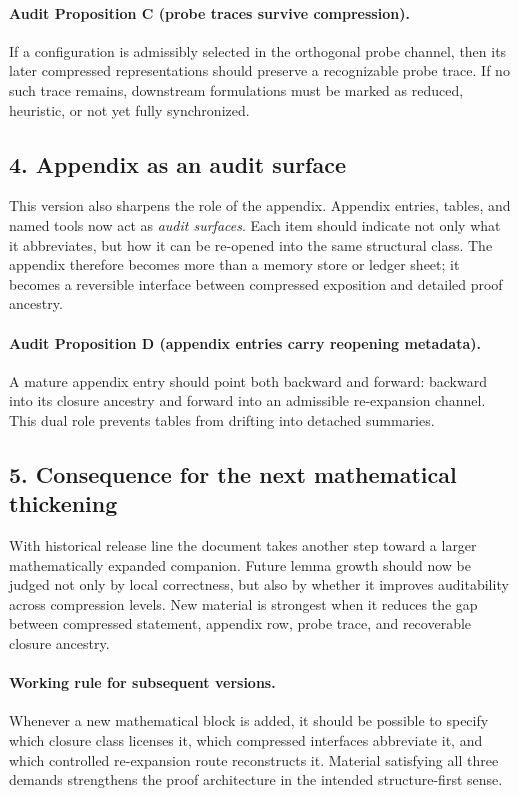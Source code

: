 \documentclass[12pt,a4paper]{article}
\DeclareRobustCommand{\QSCver}[1]{archival stage}
\renewcommand{\QSCver}[1]{historical release line}
\begin{document}
\paragraph{Audit Proposition C (probe traces survive compression).}
If a configuration is admissibly selected in the orthogonal probe channel, then
its later compressed representations should preserve a recognizable probe trace.
If no such trace remains, downstream formulations must be marked as reduced,
heuristic, or not yet fully synchronized.

\subsection*{4. Appendix as an audit surface}
This version also sharpens the role of the appendix. Appendix entries, tables,
and named tools now act as \emph{audit surfaces}. Each item should indicate not
only what it abbreviates, but how it can be re-opened into the same structural
class. The appendix therefore becomes more than a memory store or ledger sheet;
it becomes a reversible interface between compressed exposition and detailed
proof ancestry.

\paragraph{Audit Proposition D (appendix entries carry reopening metadata).}
A mature appendix entry should point both backward and forward: backward into
its closure ancestry and forward into an admissible re-expansion channel. This
dual role prevents tables from drifting into detached summaries.

\subsection*{5. Consequence for the next mathematical thickening}
With \QSCver{v2.1.0} the document takes another step toward a larger mathematically
expanded companion. Future lemma growth should now be judged not only by local
correctness, but also by whether it improves auditability across compression
levels. New material is strongest when it reduces the gap between compressed
statement, appendix row, probe trace, and recoverable closure ancestry.

\paragraph{Working rule for subsequent versions.}
Whenever a new mathematical block is added, it should be possible to specify
which closure class licenses it, which compressed interfaces abbreviate it, and
which controlled re-expansion route reconstructs it. Material satisfying all
three demands strengthens the proof architecture in the intended structure-first
sense.
\end{document}
